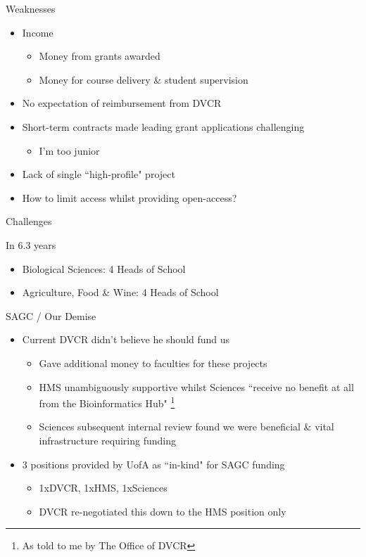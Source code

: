 \documentclass[11pt]{beamer}
\newcommand\blfootnote[1]{%
  \begingroup
  \renewcommand\thefootnote{}\footnote{#1}%
  \addtocounter{footnote}{-1}%
  \endgroup
}
\begin{document}
\begin{frame}{Weaknesses}

	\begin{itemize}
		\item Income
		\begin{itemize}
			\item Money from grants awarded
			\item Money for course delivery \& student supervision
		\end{itemize}		 
		\item No expectation of reimbursement from DVCR
		\item Short-term contracts made leading grant applications challenging
		\begin{itemize}
			\item I'm too junior
		\end{itemize}
		\item Lack of single ``high-profile" project
		\item How to limit access whilst providing open-access?\\[1cm]
	\end{itemize}

\end{frame}

\begin{frame}{Challenges}

In 6.3 years

	\begin{itemize}
		\item Biological Sciences: 4 Heads of School
		\item Agriculture, Food \& Wine: 4 Heads of School	
	\end{itemize}

\end{frame}

\begin{frame}{SAGC / Our Demise}

	\begin{itemize}
		\item Current DVCR didn't believe he should fund us
		\begin{itemize}
			\item Gave additional money to faculties for these projects
			\item HMS unambiguously supportive whilst Sciences ``receive no benefit at all from the Bioinformatics Hub"\blfootnote{As told to me by The Office of DVCR}
			\item Sciences subsequent internal review found we were beneficial \& vital infrastructure requiring funding
		\end{itemize}
		\item 3 positions provided by UofA as ``in-kind" for SAGC funding 
		\begin{itemize}
			\item 1xDVCR, 1xHMS, 1xSciences
			\item DVCR re-negotiated this down to the HMS position only\\[5mm]
		\end{itemize}
	\end{itemize}

\end{frame}
\end{document}
